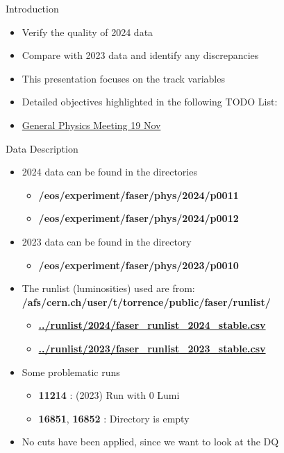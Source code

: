 \begin{frame}{Introduction}
    \begin{itemize}
        \item Verify the quality of 2024 data
        \item Compare with 2023 data and identify any discrepancies
        \item This presentation focuses on the track variables
        \item Detailed objectives highlighted in the following TODO List:
        \item[] \href{https://indico.cern.ch/event/1476946/?note=304369}{General Physics Meeting 19 Nov}
    \end{itemize}
\end{frame}

\begin{frame}{Data Description}
    \begin{itemize}
        \item 2024 data can be found in the directories
              \begin{itemize}
                  \item \textbf{/eos/experiment/faser/phys/2024/p0011}
                  \item \textbf{/eos/experiment/faser/phys/2024/p0012}
              \end{itemize}
        \item 2023 data can be found in the directory
              \begin{itemize}
                  \item \textbf{/eos/experiment/faser/phys/2023/p0010}
              \end{itemize}
        \item The runlist (luminosities) used are from:
              \textbf{/afs/cern.ch/user/t/torrence/public/faser/runlist/}
              \begin{itemize}
                  \item \href{/afs/cern.ch/user/t/torrence/public/faser/runlist/2024/faser_runlist_2024_stable.csv}{\textbf{../runlist/2024/faser\_runlist\_2024\_stable.csv}}
                  \item \href{/afs/cern.ch/user/t/torrence/public/faser/runlist/2023/faser_runlist_2023_stable.csv}{\textbf{../runlist/2023/faser\_runlist\_2023\_stable.csv}}
              \end{itemize}
        \item Some problematic runs
              \begin{itemize}
                  \item \textbf{11214} : (2023) Run with 0 Lumi
                  \item \textbf{16851}, \textbf{16852} : Directory is empty
              \end{itemize}
        \item No cuts have been applied, since we want to look at the DQ
    \end{itemize}
\end{frame}


